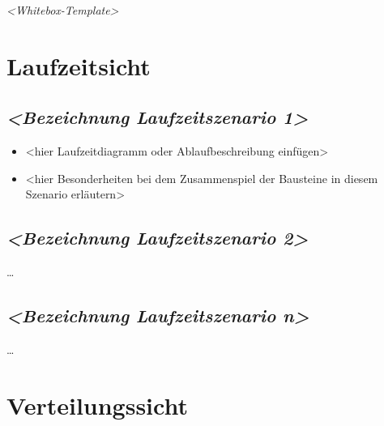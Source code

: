 \documentclass[
]{article}
\begin{document}
\emph{\textless Whitebox-Template\textgreater{}}

\hypertarget{section-runtime-view}{%
\section{Laufzeitsicht}\label{section-runtime-view}}

\hypertarget{__emphasis_bezeichnung_laufzeitszenario_1_emphasis}{%
\subsection{\texorpdfstring{\emph{\textless Bezeichnung Laufzeitszenario
1\textgreater{}}}{\textless Bezeichnung Laufzeitszenario 1\textgreater{}}}\label{__emphasis_bezeichnung_laufzeitszenario_1_emphasis}}

\begin{itemize}
\item
  \textless hier Laufzeitdiagramm oder Ablaufbeschreibung
  einfügen\textgreater{}
\item
  \textless hier Besonderheiten bei dem Zusammenspiel der Bausteine in
  diesem Szenario erläutern\textgreater{}
\end{itemize}

\hypertarget{__emphasis_bezeichnung_laufzeitszenario_2_emphasis}{%
\subsection{\texorpdfstring{\emph{\textless Bezeichnung Laufzeitszenario
2\textgreater{}}}{\textless Bezeichnung Laufzeitszenario 2\textgreater{}}}\label{__emphasis_bezeichnung_laufzeitszenario_2_emphasis}}

\ldots{}

\hypertarget{__emphasis_bezeichnung_laufzeitszenario_n_emphasis}{%
\subsection{\texorpdfstring{\emph{\textless Bezeichnung Laufzeitszenario
n\textgreater{}}}{\textless Bezeichnung Laufzeitszenario n\textgreater{}}}\label{__emphasis_bezeichnung_laufzeitszenario_n_emphasis}}

\ldots{}

\hypertarget{section-deployment-view}{%
\section{Verteilungssicht}\label{section-deployment-view}}
\end{document}
